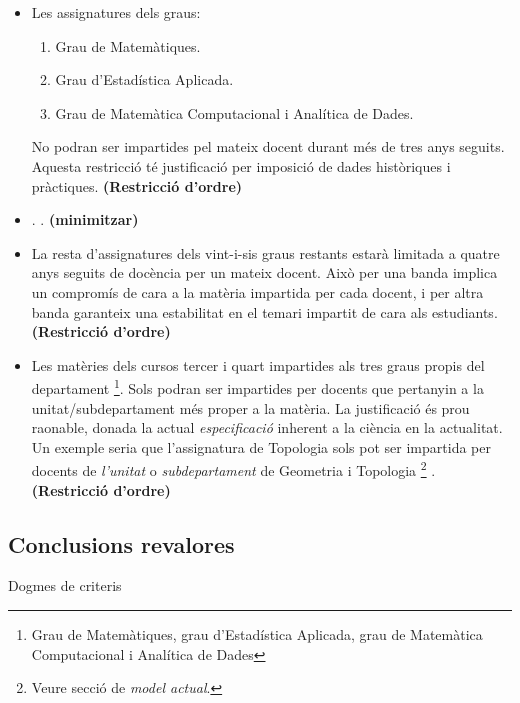 \documentclass[10pt,twocolumn]{article}
\begin{document}
\begin{enumerate}
\begin{itemize}
    	\item Les assignatures dels graus:
    	\begin{enumerate} 
    		\item Grau de Matemàtiques.
    		\item Grau d'Estadística Aplicada.
    		\item Grau de Matemàtica Computacional i Analítica de Dades.
    	\end{enumerate}
      No podran ser impartides pel mateix docent durant més de tres anys seguits.
      {\color{gray} Aquesta restricció té justificació per imposició de dades històriques i pràctiques.} \textbf{(Restricció d'ordre)} 
    	\item  . {\color{gray} .} \textbf{(minimitzar)} 
    	\item La resta d'assignatures dels vint-i-sis graus restants estarà limitada a quatre anys seguits de docència per un mateix docent. {\color{gray} Això per una banda implica un compromís de cara a la matèria impartida per cada docent, i per altra banda garanteix una estabilitat en el temari impartit de cara als estudiants.} \textbf{(Restricció d'ordre)} 
    	\item  Les matèries  dels cursos tercer i quart impartides als tres graus propis del departament \footnote{Grau de Matemàtiques, grau d'Estadística Aplicada, grau de Matemàtica Computacional i Analítica de Dades}. Sols podran ser impartides per docents que pertanyin a la unitat/subdepartament més proper a la matèria.   {\color{gray} La justificació és prou raonable, donada la actual \textit{especificació} inherent a la ciència en la actualitat. Un exemple seria que l'assignatura de Topologia sols pot ser impartida per docents de \textit{l'unitat} o \textit{subdepartament} de Geometria i Topologia \footnote{Veure secció de  \textit{model actual}.} .} \textbf{(Restricció d'ordre)} 
    \end{itemize}																								
\begin{tcolorbox}[colframe=white,colback=redviolet!20,sharp corners=all,size=minimal,halign=center,valign=center]
	\section{Conclusions revalores}
\end{tcolorbox}
\end{enumerate}
Dogmes de criteris
\footnotesize


\end{document}
